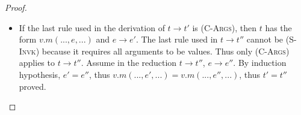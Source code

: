 \begin{proof}
\begin{itemize}
	\item If the last rule used in the derivation of $t \to t'$ is \textsc{(C-Args)}, then $t$ has the form $v.m(..., e, ...)$ and $e \to e'$. The last rule used in $t \to t''$ cannot be \textsc{(S-Invk)} because it requires all arguments to be values. Thus only \textsc{(C-Args)} applies to $t \to t''$. Assume in the reduction $t \to t''$, $e \to e''$. By induction hypothesis, $e' = e''$, thus $v.m(..., e', ...) = v.m(..., e'', ...)$, thus $t' = t''$ proved.
\end{itemize}
\end{proof}

\begin{comment}
If the last rule used in the derivation of t  → t′ is E-IfTrue, then we know that t has the form if t1 then t2 else t3, where t1 = true. But now it is obvious that the last rule in the derivation of t  → t′′ cannot be E-IfFalse, since we cannot have both t1 = true and t1 = false. Moreover, the last rule in the second derivation cannot be E-If either, since the premise of this rule demands that t1  → t′1 for some t′1, but we have already observed that true does not evaluate to anything. So the last rule in the second derivation can only be E-IfTrue, and it immediately follows that t′ = t′′.
\end{comment}
